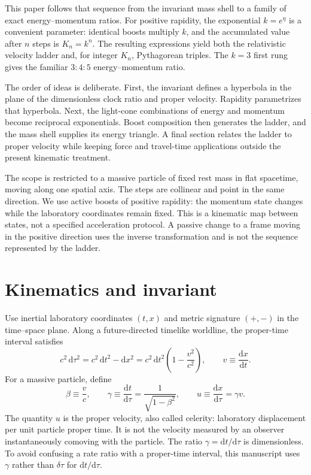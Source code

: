 \documentclass[12pt]{article}
\begin{document}
This paper follows that sequence from the invariant mass shell to a family of exact energy--momentum ratios. For positive rapidity, the exponential $k=e^\eta$ is a convenient parameter: identical boosts multiply $k$, and the accumulated value after $n$ steps is $K_n=k^n$. The resulting expressions yield both the relativistic velocity ladder and, for integer $K_n$, Pythagorean triples. The $k=3$ first rung gives the familiar $3{:}4{:}5$ energy--momentum ratio.

The order of ideas is deliberate. First, the invariant defines a hyperbola in the plane of the dimensionless clock ratio and proper velocity. Rapidity parametrizes that hyperbola. Next, the light-cone combinations of energy and momentum become reciprocal exponentials. Boost composition then generates the ladder, and the mass shell supplies its energy triangle. A final section relates the ladder to proper velocity while keeping force and travel-time applications outside the present kinematic treatment.

The scope is restricted to a massive particle of fixed rest mass in flat spacetime, moving along one spatial axis. The steps are collinear and point in the same direction. We use active boosts of positive rapidity: the momentum state changes while the laboratory coordinates remain fixed. This is a kinematic map between states, not a specified acceleration protocol. A passive change to a frame moving in the positive direction uses the inverse transformation and is not the sequence represented by the ladder.

\section{Kinematics and invariant}
\label{sec:kinematics}

Use inertial laboratory coordinates $(t,x)$ and metric signature $(+,-)$ in the time--space plane. Along a future-directed timelike worldline, the proper-time interval satisfies
\begin{equation}
  c^2\,\mathrm{d}\tau^2
  =c^2\,\mathrm{d}t^2-\mathrm{d}x^2
  =c^2\,\mathrm{d}t^2\left(1-\frac{v^2}{c^2}\right),
  \qquad v\equiv\frac{\mathrm{d}x}{\mathrm{d}t}.
  \label{eq:proper-time-interval}
\end{equation}
For a massive particle, define
\begin{equation}
  \beta\equiv\frac{v}{c},
  \qquad
  \gamma\equiv\frac{\mathrm{d}t}{\mathrm{d}\tau}
  =\frac{1}{\sqrt{1-\beta^2}},
  \qquad
  u\equiv\frac{\mathrm{d}x}{\mathrm{d}\tau}=\gamma v.
  \label{eq:beta-gamma-u}
\end{equation}
The quantity $u$ is the proper velocity, also called celerity: laboratory displacement per unit particle proper time. It is not the velocity measured by an observer instantaneously comoving with the particle. The ratio $\gamma=\mathrm{d}t/\mathrm{d}\tau$ is dimensionless. To avoid confusing a rate ratio with a proper-time interval, this manuscript uses $\gamma$ rather than $\delta\tau$ for $\mathrm{d}t/\mathrm{d}\tau$.
\end{document}
